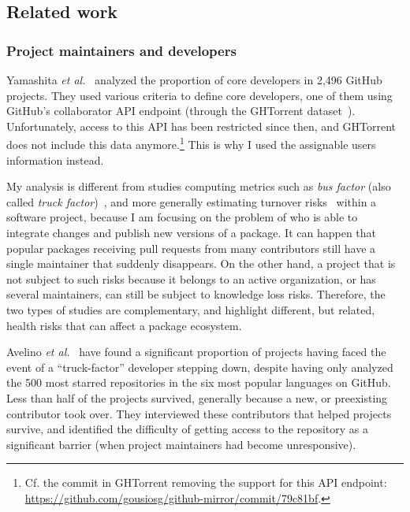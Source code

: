 \subsection{Related work}

\subsubsection{Project maintainers and developers}

Yamashita \emph{et al.}~\cite{yamashita2015revisiting} analyzed the proportion of core developers in 2,496 GitHub projects.
They used various criteria to define core developers, one of them using GitHub's collaborator API endpoint (through the GHTorrent dataset~\cite{gousios2012ghtorrent}).
Unfortunately, access to this API has been restricted since then, and GHTorrent does not include this data anymore.\footnote{
	Cf. the commit in GHTorrent removing the support for this API endpoint: \url{https://github.com/gousiosg/github-mirror/commit/79c81bf}.
}
This is why I used the assignable users information instead.

My analysis is different from studies computing metrics such as \emph{bus factor} (also called \emph{truck factor})~\cite{ferreira2019algorithms,torchiano2011my}, and more generally estimating turnover risks~\cite{rigby2016quantifying,nassif2017revisiting} within a software project, because I am focusing on the problem of who is able to integrate changes and publish new versions of a package.
It can happen that popular packages receiving pull requests from many contributors still have a single maintainer that suddenly disappears.
On the other hand, a project that is not subject to such risks because it belongs to an active organization, or has several maintainers, can still be subject to knowledge loss risks.
Therefore, the two types of studies are complementary, and highlight different, but related, health risks that can affect a package ecosystem.

Avelino \emph{et al.}~\cite{avelino2019abandonment} have found a significant proportion of projects having faced the event of a ``truck-factor'' developer stepping down, despite having only analyzed the 500 most starred repositories in the six most popular languages on GitHub.
Less than half of the projects survived, generally because a new, or preexisting contributor took over.
They interviewed these contributors that helped projects survive, and identified the difficulty of getting access to the repository as a significant barrier (when project maintainers had become unresponsive).

